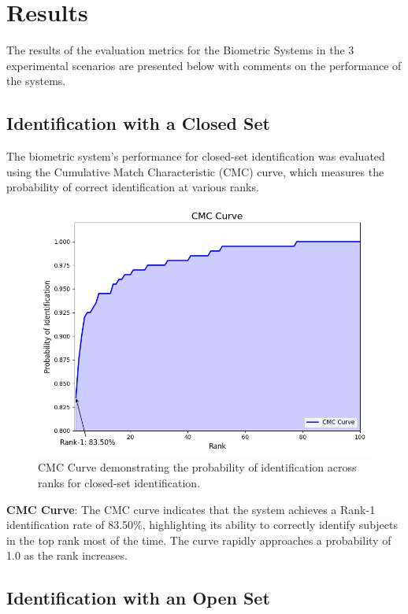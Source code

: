 \section{Results}
The results of the evaluation metrics for the Biometric Systems in the 3 experimental scenarios are presented below with comments on the performance of the systems.

\subsection{Identification with a Closed Set}

The biometric system's performance for closed-set identification was evaluated using the Cumulative Match Characteristic (CMC) curve, which measures the probability of correct identification at various ranks.

\begin{figure}[!ht]
    \centering
    \includegraphics[width=\columnwidth]{./images/plots/id-close/cmc_curve.png}
    \caption{CMC Curve demonstrating the probability of identification across ranks for closed-set identification.}
    \label{fig:cmc_curve}
\end{figure}

\textbf{CMC Curve}: The CMC curve indicates that the system achieves a Rank-1 identification rate of 83.50\%, highlighting its ability to correctly identify subjects in the top rank most of the time. The curve rapidly approaches a probability of 1.0 as the rank increases.

\subsection{Identification with an Open Set}

